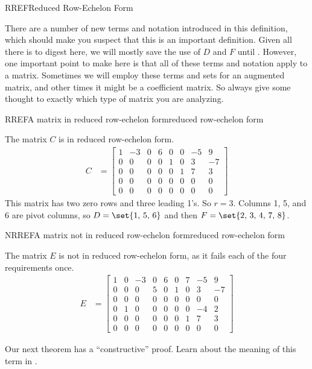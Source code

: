 \begin{subsect}{RREF}{Reduced Row-Echelon Form}
%
\begin{para}There are a number of new terms and notation introduced in this definition, which should make you suspect that this is an important definition.  Given all there is to digest here, we will mostly save the use of $D$ and $F$ until .  However, one important point to make here is that all of these terms and notation apply to a matrix.  Sometimes we will employ these terms and sets for an augmented matrix, and other times it might be a coefficient matrix.  So always give some thought to exactly which type of matrix you are analyzing.\end{para}
%
\begin{example}{RREF}{A matrix in reduced row-echelon form}{reduced row-echelon form}
\begin{para}The matrix $C$ is in reduced row-echelon form.
\begin{align*}
C&=
\begin{bmatrix}
1&-3&0&6&0&0&-5&9\\
0&0&0&0&1&0&3&-7\\
0&0&0&0&0&1&7&3\\
0&0&0&0&0&0&0&0\\
0&0&0&0&0&0&0&0
\end{bmatrix}
\end{align*}
This matrix has two zero rows and three leading 1's.   So $r=3$.  Columns 1, 5, and 6 are pivot columns, so $D=\set{1,\,5,\,6}$ and then $F=\set{2,\,3,\,4,\,7,\,8}$.\end{para}
\end{example}
%
\begin{example}{NRREF}{A matrix not in reduced row-echelon form}{reduced row-echelon form}
\begin{para}The matrix $E$ is not in reduced row-echelon form, as it fails each of the four requirements once.
\begin{align*}
E&=
\begin{bmatrix}
1&0&-3&0&6&0&7&-5&9\\
0&0&0&5&0&1&0&3&-7\\
0&0&0&0&0&0&0&0&0\\
0&1&0&0&0&0&0&-4&2\\
0&0&0&0&0&0&1&7&3\\
0&0&0&0&0&0&0&0&0
\end{bmatrix}
\end{align*}\end{para}
\end{example}
%
\begin{para}Our next theorem has a ``constructive'' proof.  Learn about the meaning of this term in .\end{para}

\end{subsect}
